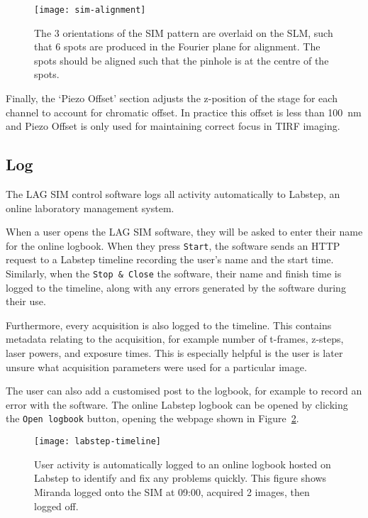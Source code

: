 \begin{figure}[htbp!]
\centering
\texttt{[image: sim-alignment]}
\caption[LAG SIM: Displaying specially designed patterns on the SLM assists with alignment of LAG SIM]{The 3 orientations of the SIM pattern are overlaid on the SLM, such that 6 spots are produced in the Fourier plane for alignment. The spots should be aligned such that the pinhole is at the centre of the spots.}
\label{fig:pinhole-alignment}
\end{figure}

Finally, the `Piezo Offset' section adjusts the z-position of the stage for each channel to account for chromatic offset. 
In practice this offset is less than \SI{100}{\nano\meter} and Piezo Offset is only used for maintaining correct focus in TIRF imaging. 

\subsection{Log}
The LAG SIM control software logs all activity automatically to Labstep, an online laboratory management system. 

When a user opens the LAG SIM software, they will be asked to enter their name for the online logbook. 
When they press \texttt{Start}, the software sends an HTTP request to a Labstep timeline recording the user's name and the start time. 
Similarly, when the \texttt{Stop \& Close} the software, their name and finish time is logged to the timeline, along with any errors generated by the software during their use. 

Furthermore, every acquisition is also logged to the timeline. 
This contains metadata relating to the acquisition, for example number of t-frames, z-steps, laser powers, and exposure times. 
This is especially helpful is the user is later unsure what acquisition parameters were used for a particular image. 

The user can also add a customised post to the logbook, for example to record an error with the software. 
The online Labstep logbook can be opened by clicking the \texttt{Open logbook} button, opening the webpage shown in Figure~\ref{fig:labstepTimeline}. 

\begin{figure}[htbp!]
\centering
\texttt{[image: labstep-timeline]}
\caption[LAG SIM: Logging user activity with Labstep allows any problems to be identified and fixed quickly]{User activity is automatically logged to an online logbook hosted on Labstep to identify and fix any problems quickly. This figure shows Miranda logged onto the SIM at 09:00, acquired 2 images, then logged off.} %
\label{fig:labstepTimeline}
\end{figure}

